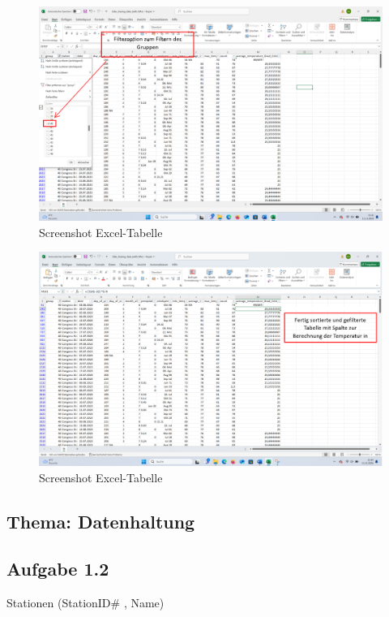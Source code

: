 \documentclass[a4paper, 12pt]{article}
\begin{document}
\newpage
\begin{figure}[!htb]
\centering
\includegraphics[scale=.4]{Screenshot 2024-11-26 201403}
\caption{Screenshot Excel-Tabelle}
\label{fig:Screenshot Excel-Tabelle}
\end{figure}

\begin{figure}[!htb]
\centering
\includegraphics[scale=.4]{Screenshot 2024-11-26 201421}
\caption{Screenshot Excel-Tabelle}
\label{fig:Screenshot Excel-Tabelle}
\end{figure}

\newpage
\subsection*{Thema: Datenhaltung}
\subsection{Aufgabe 1.2}
Stationen (StationID# , Name)
\\
\end{document}
